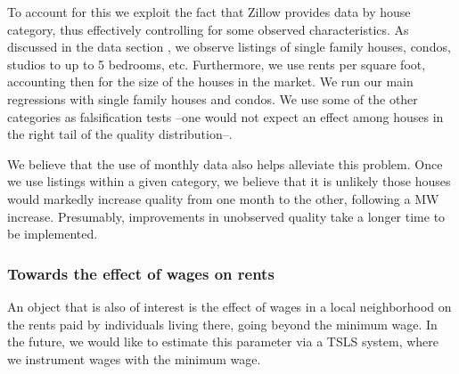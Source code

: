     To account for this we exploit the fact that Zillow provides data by house category, thus effectively controlling for some observed characteristics. As discussed in the data section 
    , we observe listings of single family houses, condos, studios to up to 5 bedrooms, etc. Furthermore, we use rents per square foot, accounting then for the size of the houses in the market. We run our main regressions with single family houses and condos. We use some of the other categories as falsification tests --one would not expect an effect among houses in the right tail of the quality distribution--.
    
    We believe that the use of monthly data also helps alleviate this problem. Once we use listings within a given category, we believe that it is unlikely those houses would markedly increase quality from one month to the other, following a MW increase. Presumably, improvements in unobserved quality take a longer time to be implemented.

    \subsubsection{Towards the effect of wages on rents}
    
    An object that is also of interest is the effect of wages in a local neighborhood on the rents paid by individuals living there, going beyond the minimum wage. In the future, we would like to estimate this parameter via a TSLS system, where we instrument wages with the minimum wage.
